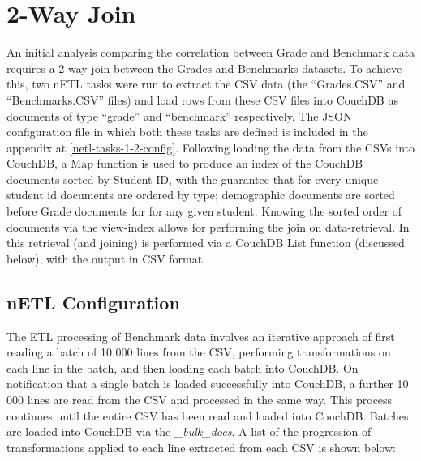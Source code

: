 \section{2-Way Join}
An initial analysis comparing the correlation between Grade and Benchmark data requires a 2-way join between the Grades and Benchmarks datasets. To achieve this, two nETL tasks were run to extract the CSV data (the ``Grades.CSV'' and ``Benchmarks.CSV'' files) and load rows from these CSV files into CouchDB as documents of type ``grade'' and ``benchmark'' respectively. The JSON configuration file in which both these tasks are defined is included in the appendix at \ref{netl-tasks-1-2-config}. Following loading the data from the CSVs into CouchDB, a Map function is used to produce an index of the CouchDB documents sorted by Student ID, with the guarantee that for every unique student id documents are ordered by type; demographic documents are sorted before Grade documents for for any given student. Knowing the sorted order of documents via the view-index allows for performing the join on data-retrieval. In this retrieval (and joining) is performed via a CouchDB List function (discussed below), with the output in CSV format.

\subsection{nETL Configuration}
The ETL processing of Benchmark data involves an iterative approach of first reading a batch of 10 000 lines from the CSV, performing transformations on each line in the batch, and then loading each batch into CouchDB. On notification that a single batch is loaded successfully into CouchDB, a further 10 000 lines are read from the CSV and processed in the same way. This process continues until the entire CSV has been read and loaded into CouchDB. Batches are loaded into CouchDB via the \textit{\_bulk\_docs}. A list of the progression of transformations applied to each line extracted from each CSV is shown below:

